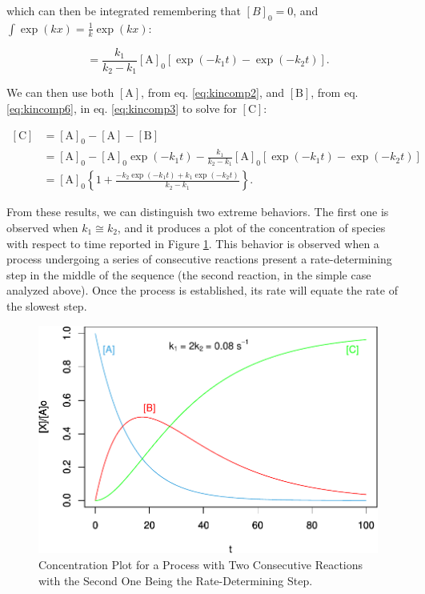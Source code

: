 \documentclass[
  9pt,
]{extbook}
\theoremstyle{definition}
\theoremstyle{definition}
\theoremstyle{definition}
\theoremstyle{remark}
\begin{document}
which can then be integrated remembering that \([B]_0=0\), and \(\int \exp(kx)=\frac{1}{k}\exp(kx)\):

\begin{equation}
[\mathrm{B}] = \frac{k_1}{k_2-k_1} [\mathrm{A}]_0 [\exp(-k_1t)-\exp(-k_2t)].
\label{eq:kincomp6}
\end{equation}

We can then use both \([\mathrm{A}]\), from eq. \eqref{eq:kincomp2}, and \([\mathrm{B}]\), from eq. \eqref{eq:kincomp6}, in eq. \eqref{eq:kincomp3} to solve for \([\mathrm{C}]\):

\begin{equation}
\begin{aligned}
\left[\mathrm{C}\right] &= [\mathrm{A}]_0-[\mathrm{A}]-[\mathrm{B}] \\
&= [\mathrm{A}]_0-[\mathrm{A}]_0 \exp(-k_1 t)-\frac{k_1}{k_2-k_1} [\mathrm{A}]_0 [\exp(-k_1t)-\exp(-k_2t)] \\
&= [\mathrm{A}]_0\left\{1+\frac{-k_2 \exp(-k_1t)+ k_1 \exp(-k_2t)}{k_2-k_1} \right\}.
\end{aligned}
\label{eq:kincomp7}
\end{equation}

From these results, we can distinguish two extreme behaviors. The first one is observed when \(k_1 \cong k_2\), and it produces a plot of the concentration of species with respect to time reported in Figure \ref{fig:figk5}. This behavior is observed when a process undergoing a series of consecutive reactions present a rate-determining step in the middle of the sequence (the second reaction, in the simple case analyzed above). Once the process is established, its rate will equate the rate of the slowest step.

\begin{figure}

{\centering \includegraphics{pchem1_files/figure-latex/figk5-1} 

}

\caption{Concentration Plot for a Process with Two Consecutive Reactions with the Second One Being the Rate-Determining Step.}\label{fig:figk5}
\end{figure}
\end{document}
